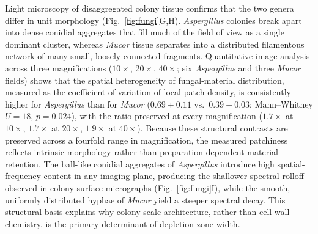 Light microscopy of disaggregated colony tissue confirms that the two
genera differ in unit morphology (Fig.~\ref{fig:fungi}G,H).
\textit{Aspergillus} colonies break apart into dense conidial
aggregates that fill much of the field of view as a single dominant
cluster, whereas \textit{Mucor} tissue separates into a distributed
filamentous network of many small, loosely connected fragments.
Quantitative image analysis across three magnifications ($10\times$,
$20\times$, $40\times$; six \textit{Aspergillus} and three
\textit{Mucor} fields) shows that the spatial heterogeneity of
fungal-material distribution, measured as the coefficient of variation
of local patch density, is consistently higher for
\textit{Aspergillus} than for \textit{Mucor} ($0.69 \pm 0.11$ vs.\
$0.39 \pm 0.03$; Mann--Whitney $U = 18$, $p = 0.024$), with the
ratio preserved at every magnification ($1.7\times$ at $10\times$,
$1.7\times$ at $20\times$, $1.9\times$ at $40\times$).  Because these
structural contrasts are preserved across a fourfold range in
magnification, the measured patchiness reflects intrinsic morphology
rather than preparation-dependent material retention.  The ball-like
conidial aggregates of \textit{Aspergillus} introduce high
spatial-frequency content in any imaging plane, producing the
shallower spectral rolloff observed in colony-surface micrographs
(Fig.~\ref{fig:fungi}I), while the smooth, uniformly distributed
hyphae of \textit{Mucor} yield a steeper spectral decay.  This
structural basis explains why colony-scale architecture, rather than
cell-wall chemistry, is the primary determinant of depletion-zone
width.



